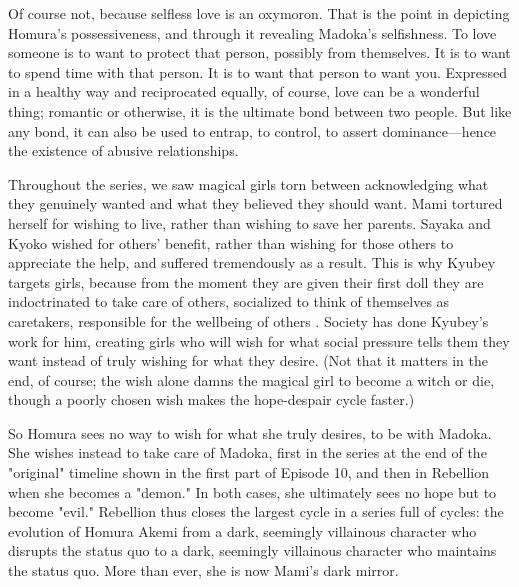 Of course not, because selfless love is an oxymoron. That is the point in depicting Homura's possessiveness, and through it revealing Madoka's selfishness. To love someone is to want to protect that person, possibly from themselves. It is to want to spend time with that person. It is to want that person to want you. Expressed in a healthy way and reciprocated equally, of course, love can be a wonderful thing; romantic or otherwise, it is the ultimate bond between two people. But like any bond, it can also be used to entrap, to control, to assert dominance—hence the existence of abusive relationships. 

Throughout the series, we saw magical girls torn between acknowledging what they genuinely wanted and what they believed they should want. Mami tortured herself for wishing to live, rather than wishing to save her parents. Sayaka and Kyoko wished for others' benefit, rather than wishing for those others to appreciate the help, and suffered tremendously as a result. This is why Kyubey targets girls, because from the moment they are given their first doll they are indoctrinated to take care of others, socialized to think of themselves as caretakers, responsible for the wellbeing of others \cite{ref119}. Society has done Kyubey's work for him, creating girls who will wish for what social pressure tells them they want instead of truly wishing for what they desire. (Not that it matters in the end, of course; the wish alone damns the magical girl to become a witch or die, though a poorly chosen wish makes the hope-despair cycle faster.)

So Homura sees no way to wish for what she truly desires, to be with Madoka. She wishes instead to take care of Madoka, first in the series at the end of the "original" timeline shown in the first part of Episode 10, and then in Rebellion when she becomes a "demon." In both cases, she ultimately sees no hope but to become "evil." Rebellion thus closes the largest cycle in a series full of cycles: the evolution of Homura Akemi from a dark, seemingly villainous character who disrupts the status quo to a dark, seemingly villainous character who maintains the status quo. More than ever, she is now Mami's dark mirror.

